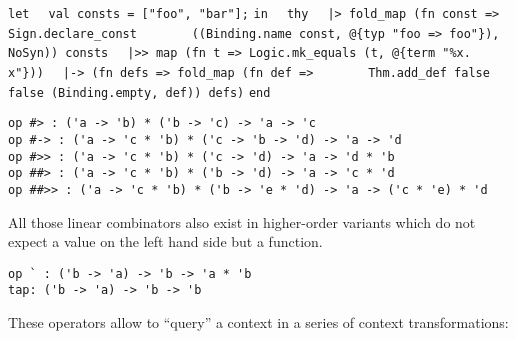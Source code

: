 \begin{isabellebody}
\begin{isamarkuptext}
  \smallskip\begin{mldecls}
\verb|let|\isasep\isanewline%
\verb|  val consts = ["foo", "bar"];|\isasep\isanewline%
\verb|in|\isasep\isanewline%
\verb|  thy|\isasep\isanewline%
\verb|  |\verb,|,\verb|> fold_map (fn const => Sign.declare_const|\isasep\isanewline%
\verb|       ((Binding.name const, @{typ "foo => foo"}), NoSyn)) consts|\isasep\isanewline%
\verb|  |\verb,|,\verb|>> map (fn t => Logic.mk_equals (t, @{term "%x. x"}))|\isasep\isanewline%
\verb|  |\verb,|,\verb|-> (fn defs => fold_map (fn def =>|\isasep\isanewline%
\verb|       Thm.add_def false false (Binding.empty, def)) defs)|\isasep\isanewline%
\verb|end|
  \end{mldecls}%
\end{isamarkuptext}%
\isamarkuptrue%
%
\isadelimmlref
%
\endisadelimmlref
%
\isatagmlref
%
\begin{isamarkuptext}%
\begin{mldecls}
  \verb|op #> : ('a -> 'b) * ('b -> 'c) -> 'a -> 'c| \\
  \verb|op #-> : ('a -> 'c * 'b) * ('c -> 'b -> 'd) -> 'a -> 'd| \\
  \verb|op #>> : ('a -> 'c * 'b) * ('c -> 'd) -> 'a -> 'd * 'b| \\
  \verb|op ##> : ('a -> 'c * 'b) * ('b -> 'd) -> 'a -> 'c * 'd| \\
  \verb|op ##>> : ('a -> 'c * 'b) * ('b -> 'e * 'd) -> 'a -> ('c * 'e) * 'd| \\
  \end{mldecls}%
\end{isamarkuptext}%
\isamarkuptrue%
%
\endisatagmlref
{\isafoldmlref}%
%
\isadelimmlref
%
\endisadelimmlref
%
\begin{isamarkuptext}%
\noindent All those linear combinators also exist in higher-order
  variants which do not expect a value on the left hand side
  but a function.%
\end{isamarkuptext}%
\isamarkuptrue%
%
\isadelimmlref
%
\endisadelimmlref
%
\isatagmlref
%
\begin{isamarkuptext}%
\begin{mldecls}
  \verb|op ` : ('b -> 'a) -> 'b -> 'a * 'b| \\
  \verb|tap: ('b -> 'a) -> 'b -> 'b| \\
  \end{mldecls}%
\end{isamarkuptext}%
\isamarkuptrue%
%
\endisatagmlref
{\isafoldmlref}%
%
\isadelimmlref
%
\endisadelimmlref
%
\begin{isamarkuptext}%
\noindent These operators allow to ``query'' a context
  in a series of context transformations:


\end{isamarkuptext}
\end{isabellebody}
